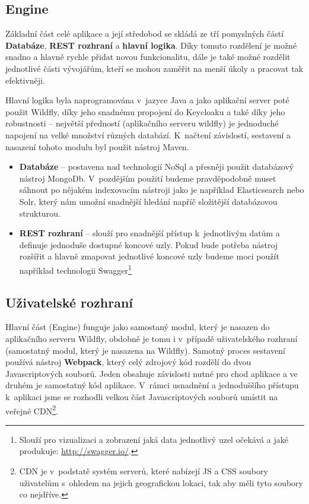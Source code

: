 \subsection{Engine}
\par Základní část celé aplikace a její středobod se skládá ze tří pomyslných částí \textbf{Databáze}, \textbf{REST rozhraní} a \textbf{hlavní logika}. Díky tomuto rozdělení je možné snadno a hlavně rychle přidat novou funkcionalitu, dále je také možné rozdělit jednotlivé části vývojářům, kteří se mohou zaměřit na menší úkoly a pracovat tak efektivněji.

\par Hlavní logika byla naprogramována v~jazyce Java a jako aplikační server poté použit Wildfly, díky jeho snadnému propojení do Keycloaku a také díky jeho robustnosti -- největší předností (aplikačního serveru wildfly) je jednoduché napojení na velké množství různých databází. K~načtení závislostí, sestavení a nasazení tohoto modulu byl použit nástroj Maven.

\begin{itemize}
\item \textbf{Databáze} --  postavena nad technologií NoSql a přesněji použit databázový nástroj MongoDb. V~pozdějším použití budeme pravděpodobně muset sáhnout po nějakém indexovacím nástroji  jako je například Elasticsearch nebo Solr, který nám umožní snadnější hledání napříč složitější databázovou strukturou.
\item \textbf{REST rozhraní} -- slouží pro snadnější přístup k~jednotlivým datům a definuje jednoduše dostupné koncové uzly. Pokud bude potřeba nástroj rozšířit a hlavně zmapovat jednotlivé koncové uzly budeme moci použít například technologii Swagger\footnote{Slouží pro vizualizaci a zobrazení jaká data jednotlivý uzel očekává a jaké produkuje: \url{http://swagger.io/}.}
\end{itemize}

\subsection{Uživatelské rozhraní}
\par Hlavní část (Engine) funguje jako samostaný modul, který je nasazen do aplikačního serveru Wildfly, obdobně je tomu i v~případě uživatelského rozhraní (samostatný modul, který je nasazena na Wildfly). Samotný proces sestavení používá nástroj \textbf{Webpack}, který celý zdrojový kód rozdělí do dvou Javascriptových souborů. Jeden obsahuje závislosti nutné pro chod aplikace a ve druhém je samostatný kód aplikace. V~rámci usnadnění a jednoduššího přístupu k~aplikaci jsme se rozhodli velkou část Javascriptových souborů umístit na veřejné CDN\footnote{CDN je v~podstatě systém serverů, které nabízejí JS a CSS soubory uživatelům s~ohledem na jejich geografickou lokaci, tak aby měli tyto soubory co nejdříve.}.


